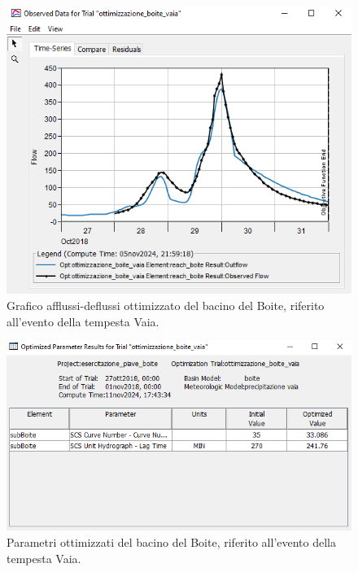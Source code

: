 \begin{figure}[H]\centering
\includegraphics[scale=1]{immagini/ottim_boite.PNG}
\caption{Grafico afflussi-deflussi ottimizzato del bacino del Boite, riferito all'evento della tempesta Vaia.}
    \label{ottim_boite}    
\end{figure}

\begin{figure}[H]\centering
    \includegraphics[scale=1]{immagini/par_ottimiz_boite.PNG}
    \caption{Parametri ottimizzati del bacino del Boite, riferito all'evento della tempesta Vaia.}
        \label{par_ottim_boite}    
    \end{figure}

